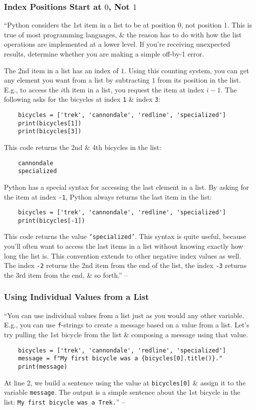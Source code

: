 \documentclass[oneside]{book}
\numberwithin{equation}{section}
\begin{document}
\subsubsection{Index Positions Start at $0$, Not $1$}
``Python considers the 1st item in a list to be at position $0$, not position $1$. This is true of most programming languages, \& the reason has to do with how the list operations are implemented at a lower level. If you're receiving unexpected results, determine whether you are making a simple off-by-1 error.

The 2nd item in a list has an index of $1$. Using this counting system, you can get any element you want from a list by subtracting $1$ from its position in the list. E.g., to access the $i$th item in a list, you request the item at index $i - 1$. The following asks for the bicycles at index \texttt{1} \& index \texttt{3}:
\begin{verbatim}
	bicycles = ['trek', 'cannondale', 'redline', 'specialized']
	print(bicycles[1])
	print(bicycles[3])
\end{verbatim}
This code returns the 2nd \& 4th bicycles in the list:
\begin{verbatim}
	cannondale
	specialized
\end{verbatim}
Python has a special syntax for accessing the last element in a list. By asking for the item at index \texttt{-1}, Python always returns the last item in the list:
\begin{verbatim}
	bicycles = ['trek', 'cannondale', 'redline', 'specialized']
	print(bicycles[-1])
\end{verbatim}
This code returns the value \texttt{'specialized'}. This syntax is quite useful, because you'll often want to access the last items in a list without knowing exactly how long the list is. This convention extends to other negative index values as well. The index \texttt{-2} returns the 2nd item from the end of the list, the index \texttt{-3} returns the 3rd item from the end, \& so forth.'' -- \cite[p. 35]{Matthes2019}

\subsubsection{Using Individual Values from a List}
``You can use individual values from a list just as you would any other variable. E.g., you can use \texttt{f}-strings to create a message based on a value from a list. Let's try pulling the 1st bicycle from the list \& composing a message using that value.
\begin{verbatim}
	bicycles = ['trek', 'cannondale', 'redline', 'specialized']
	message = f"My first bicycle was a {bicycles[0].title()}."
	print(message)
\end{verbatim}
At line 2, we build a sentence using the value at \texttt{bicycles[0]} \& assign it to the variable \texttt{message}. The output is a simple sentence about the 1st bicycle in the list: \verb|My first bicycle was a Trek.|'' -- \cite[pp. 35--36]{Matthes2019}
\end{document}
